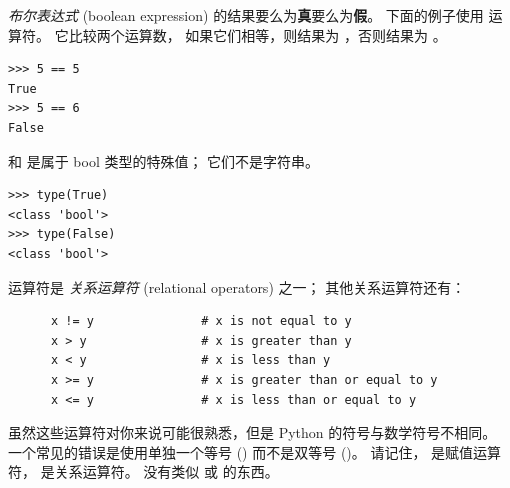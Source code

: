 {{{{\em 布尔表达式} (boolean expression) 的结果要么为{\bf 真}要么为{\bf 假}。
下面的例子使用 \li{==} 运算符。 它比较两个运算数，
如果它们相等，则结果为  ，否则结果为  。

\begin{lstlisting}
>>> 5 == 5
True
>>> 5 == 6
False
\end{lstlisting}

%

 和  是属于 bool 类型的特殊值； 它们不是字符串。

  
  
  
  
  
  



\begin{lstlisting}
>>> type(True)
<class 'bool'>
>>> type(False)
<class 'bool'>
\end{lstlisting}

%

\li{==} 运算符是 {\em 关系运算符} (relational operators) 之一； 其他关系运算符还有：


\begin{lstlisting}
      x != y               # x is not equal to y
      x > y                # x is greater than y
      x < y                # x is less than y
      x >= y               # x is greater than or equal to y
      x <= y               # x is less than or equal to y
\end{lstlisting}

%

虽然这些运算符对你来说可能很熟悉，但是 Python 的符号与数学符号不相同。
一个常见的错误是使用单独一个等号 (\li{=}) 而不是双等号 (\li{==})。
请记住， \li{=} 是赋值运算符， \li{==} 是关系运算符。 没有类似 \li{=<} 或 \li{=>} 的东西。

  
  

}}}

